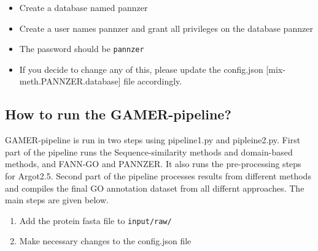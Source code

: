 \documentclass[11pt,letterpaper]{article}
\begin{document}
\begin{itemize}
 \tightlist
 \item
       Create a database named pannzer
 \item
       Create a user names pannzer and grant all privileges on the database
       pannzer
 \item
       The password should be \texttt{pannzer}
 \item
       If you decide to change any of this, please update the config.json
       {[}mix-meth.PANNZER.database{]} file accordingly.
\end{itemize}

\subsection{How to run the
 GAMER-pipeline?}\label{how-to-run-the-gamer-pipeline}

GAMER-pipeline is run in two steps using pipeline1.py and pipleine2.py.
First part of the pipeline runs the Sequence-similarity methods and
domain-based methods, and FANN-GO and PANNZER. It also runs the
pre-processing steps for Argot2.5. Second part of the pipeline processes
results from different methods and compiles the final GO annotation
dataset from all differnt approaches. The main steps are given below.

\begin{enumerate}
 \def\labelenumi{\arabic{enumi}.}
 \tightlist
 \item
       Add the protein fasta file to \texttt{input/raw/}
 \item
       Make necessary changes to the config.json file
\end{enumerate}
\end{document}
